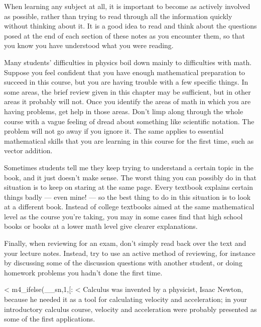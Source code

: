 When learning any subject at all, it is important to become
as actively involved as possible, rather than trying to read
through all the information quickly without thinking about
it. It is a good idea to read and think about the questions
posed at the end of each section of these notes as you
encounter them, so that you know you have understood
what you were reading.

Many students' difficulties in physics boil down mainly to
difficulties with math. Suppose you feel confident that you
have enough mathematical preparation to succeed in this
course, but you are having trouble with a few specific
things. In some areas, the brief review given in this
chapter may be sufficient, but in other areas it probably
will not. Once you identify the areas of math in which you
are having problems, get help in those areas. Don't limp
along through the whole course with a vague feeling of dread
about something like scientific notation. The problem will
not go away if you ignore it. The same applies to essential
mathematical skills that you are learning in this course for
the first time, such as vector addition.

Sometimes students tell me they keep trying to understand a
certain topic in the book, and it just doesn't make sense.
The worst thing you can possibly do in that situation is to
keep on staring at the same page. Every textbook explains
certain things badly --- even mine! --- so the best thing to
do in this situation is to look at a different book. Instead
of college textbooks aimed at the same mathematical level as
the course you're taking, you may in some cases find that
high school books or books at a lower math level give
clearer explanations.

 Finally, when reviewing for an exam, don't simply read back
over the text and your lecture notes. Instead, try to use an
active method of reviewing, for instance by discussing some
of the discussion questions with another student, or doing
homework problems you hadn't done the first time.

<%
m4_ifelse(__sn,1,[:
<%
Calculus was invented by a physicist, Isaac Newton, because he needed it as
a tool for calculating velocity and acceleration; in your introductory calculus
course, velocity and acceleration were probably presented as some of the first
applications.

